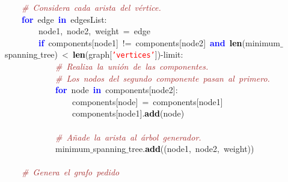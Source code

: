 \mbox{}\ \ \ \ \textit{\textcolor{Brown}{\#\ Considera\ cada\ arista\ del\ vértice.}} \\
\mbox{}\ \ \ \ \textbf{\textcolor{Blue}{for}}\ edge\ \textbf{\textcolor{Blue}{in}}\ edgesList\textcolor{BrickRed}{:} \\
\mbox{}\ \ \ \ \ \ \ \ node1\textcolor{BrickRed}{,}\ node2\textcolor{BrickRed}{,}\ weight\ \textcolor{BrickRed}{=}\ edge \\
\mbox{}\ \ \ \ \ \ \ \ \textbf{\textcolor{Blue}{if}}\ components\textcolor{BrickRed}{[}node1\textcolor{BrickRed}{]}\ \textcolor{BrickRed}{!=}\ components\textcolor{BrickRed}{[}node2\textcolor{BrickRed}{]}\ \textbf{\textcolor{Blue}{and}}\ \textbf{\textcolor{Black}{len}}\textcolor{BrickRed}{(}minimum$\_$spanning$\_$tree\textcolor{BrickRed}{)}\ \textcolor{BrickRed}{\textless{}}\ \textbf{\textcolor{Black}{len}}\textcolor{BrickRed}{(}graph\textcolor{BrickRed}{[}\texttt{\textcolor{Red}{'vertices'}}\textcolor{BrickRed}{])-}limit\textcolor{BrickRed}{:} \\
\mbox{}\ \ \ \ \ \ \ \ \ \ \ \ \textit{\textcolor{Brown}{\#\ Realiza\ la\ unión\ de\ las\ componentes.}} \\
\mbox{}\ \ \ \ \ \ \ \ \ \ \ \ \textit{\textcolor{Brown}{\#\ Los\ nodos\ del\ segundo\ componente\ pasan\ al\ primero.}} \\
\mbox{}\ \ \ \ \ \ \ \ \ \ \ \ \textbf{\textcolor{Blue}{for}}\ node\ \textbf{\textcolor{Blue}{in}}\ components\textcolor{BrickRed}{[}node2\textcolor{BrickRed}{]:} \\
\mbox{}\ \ \ \ \ \ \ \ \ \ \ \ \ \ \ \ components\textcolor{BrickRed}{[}node\textcolor{BrickRed}{]}\ \textcolor{BrickRed}{=}\ components\textcolor{BrickRed}{[}node1\textcolor{BrickRed}{]} \\
\mbox{}\ \ \ \ \ \ \ \ \ \ \ \ \ \ \ \ components\textcolor{BrickRed}{[}node1\textcolor{BrickRed}{].}\textbf{\textcolor{Black}{add}}\textcolor{BrickRed}{(}node\textcolor{BrickRed}{)} \\
\mbox{}\ \ \ \ \ \ \ \ \ \ \ \  \\
\mbox{}\ \ \ \ \ \ \ \ \ \ \ \ \textit{\textcolor{Brown}{\#\ Añade\ la\ arista\ al\ árbol\ generador.}} \\
\mbox{}\ \ \ \ \ \ \ \ \ \ \ \ minimum$\_$spanning$\_$tree\textcolor{BrickRed}{.}\textbf{\textcolor{Black}{add}}\textcolor{BrickRed}{((}node1\textcolor{BrickRed}{,}\ node2\textcolor{BrickRed}{,}\ weight\textcolor{BrickRed}{))} \\
\mbox{} \\
\mbox{}\ \ \ \ \textit{\textcolor{Brown}{\#\ Genera\ el\ grafo\ pedido}} \\
